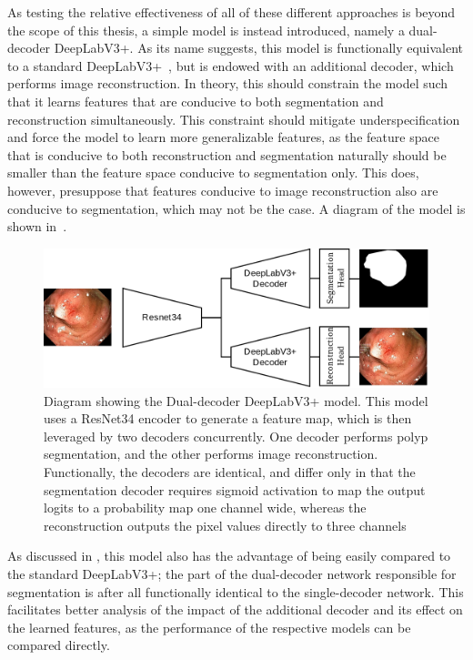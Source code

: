 As testing the relative effectiveness of all of these different approaches is beyond the scope of this thesis, a simple model is instead introduced, namely a dual-decoder DeepLabV3+. As its name suggests, this model is functionally equivalent to a standard DeepLabV3+~\cite{deeplab}, but is endowed with an additional decoder, which performs image reconstruction. In theory, this should constrain the model such that it learns features that are conducive to both segmentation and reconstruction simultaneously. This constraint should mitigate underspecification and force the model to learn more generalizable features, as the feature space that is conducive to both reconstruction and segmentation naturally should be smaller than the feature space conducive to segmentation only. This does, however, presuppose that features conducive to image reconstruction also are conducive to segmentation, which may not be the case. A diagram of the model is shown in~.
\begin{figure}[htb]
    \centering
    \includegraphics[width=\linewidth]{illustrations/InductiveNet.drawio.png}
    \caption[Dual Decoder DeepLabV3]{Diagram showing the Dual-decoder DeepLabV3+ model. This model uses a ResNet34 encoder to generate a feature map, which is then leveraged by two decoders concurrently. One decoder performs polyp segmentation, and the other performs image reconstruction. Functionally, the decoders are identical, and differ only in that the segmentation decoder requires sigmoid activation to map the output logits to a probability map one channel wide, whereas the reconstruction outputs the pixel values directly to three channels}
    \label{fig:dddeeplabv3}
\end{figure}

As discussed in , this model also has the advantage of being easily compared to the standard DeepLabV3+; the part of the dual-decoder network responsible for segmentation is after all functionally identical to the single-decoder network. This facilitates better analysis of the impact of the additional decoder and its effect on the learned features, as the performance of the respective models can be compared directly. 

